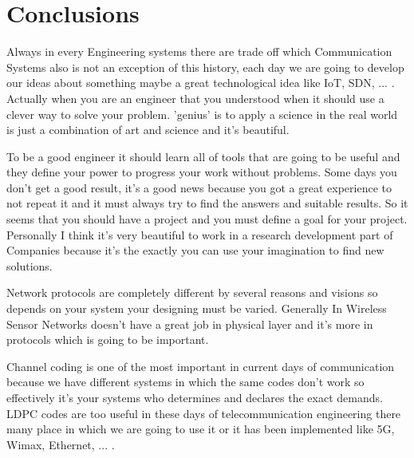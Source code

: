 
\chapter{Conclusions} %

\label{Conclusion} %



Always in every Engineering systems there are trade off which Communication Systems also is not an exception of this history, each day we are going to develop our ideas about something maybe a great technological idea like IoT, SDN, ... . Actually when you are an engineer that you understood when it should use a clever way to solve your problem. 'genius' is to apply a science in the real world is just a combination of art and science and it's beautiful.

To be a good engineer it should learn all of tools that are going to be useful and they define your power to progress your work without problems. Some days you don't get a good result, it's a good news because you got a great experience to not repeat it and it must always try to find the answers and suitable results. So it seems that you should have a project and you must define a goal for your project. Personally I think it's very beautiful to work in a research development part of Companies because it's the exactly you can use your imagination to find new solutions. 

Network protocols are completely different by several reasons and visions so depends on your system your designing must be varied. Generally In Wireless Sensor Networks doesn't have a great job in physical layer and it's more in protocols which is going to be important.

Channel coding is one of the most important in current days of communication because we have different systems in which the same codes don't work so effectively it's your systems who determines and declares the exact demands. LDPC codes are too useful in these days of telecommunication engineering there many place in which we are going to use it or it has been implemented like 5G, Wimax, Ethernet, ... .

     



